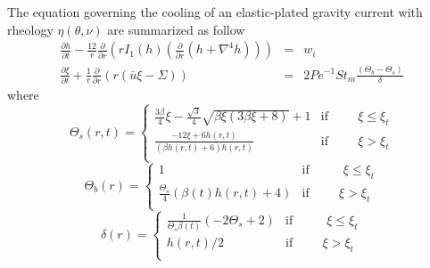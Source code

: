   The  equation governing  the  cooling of  an elastic-plated  gravity
  current with rheology $\eta(\theta,\nu)$ are summarized as follow
  \begin{eqnarray}
    \frac{\partial h}{\partial t}-\frac{12}{r}
    \frac{\partial}{\partial      r}
    \left(      r      I_1(h)\left(     \frac{\partial      }{\partial
    r}\left(h+\nabla^4h\right)\right)\right)
\label{C3-HF}
    & =& w_i\\
    \frac{\partial                                       \xi}{\partial
    t}+\frac{1}{r}\frac{\partial}{\partial                          r}
    \left( r\left(\bar{u}\xi-\Sigma\right)\right)&=&2Pe^{-1}St_m\frac{\left(\Theta_b-\Theta_s\right)}{\delta}\label{C3-TF}
  \end{eqnarray}
  where
  \begin{equation}
    \Theta_s(r,t)=
    \begin{cases}
      \frac{3 \beta}{4} \xi - \frac{\sqrt{3}}{4} \sqrt{\beta \xi \left(3 \beta \xi + 8\right)} + 1 & \text{if} \hspace{1cm} \xi\leq \xi_t \\
      \frac{- 12 \xi + 6 h{\left (r,t \right )}}{\left(\beta h{\left (r,t \right )} + 6\right) h{\left (r,t \right )}} & \text{if} \hspace{1cm} \xi > \xi_t\\
    \end{cases}
\label{C3-TS}
  \end{equation}
  \begin{equation}
    \Theta_b(r)=
    \begin{cases}
      1 &\text{if } \hspace{1cm} \xi\leq \xi_t \\
      \frac{\Theta_{s}}{4} \left(\beta(t) h{\left (r,t \right )} +
        4\right) & \text{if} \hspace{1cm} \xi > \xi_t\\
    \end{cases}
\label{C3-TB}
  \end{equation}
  \begin{equation}
    \delta(r)=
    \begin{cases}
      \frac{1}{\Theta_{s} \beta(t)} \left(- 2 \Theta_{s} + 2\right) &\text{if } \hspace{1cm} \xi\leq \xi_t \\
      h(r,t)/2 & \text{if} \hspace{1cm} \xi > \xi_t\\
    \end{cases}
\label{C3-DELTA}
  \end{equation}
